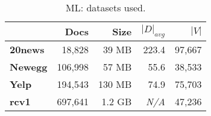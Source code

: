 \begin{table}[t]
\centering
{\small
\begin{tabular}{|l|r|r|r|r|}
    \hline & \textbf{Docs} & \textbf{Size} & \textbf{$|D|_{avg}$} & \textbf{$|V|$} \\
    \hline
    \textbf{20news}  & 18,828     & 39 MB  & 223.4      & 97,667     \\
    \textbf{Newegg}  & 106,998    & 57 MB  & 55.6       & 38,533     \\
    \textbf{Yelp}    & 194,543    & 130 MB & 74.9       & 75,703 \\
    \textbf{rcv1}    & 697,641    & 1.2 GB & \emph{N/A} & 47,236 \\
    \hline
\end{tabular}
}
\caption{ML: datasets used.}
\label{table:ml-datasets}
\end{table}
